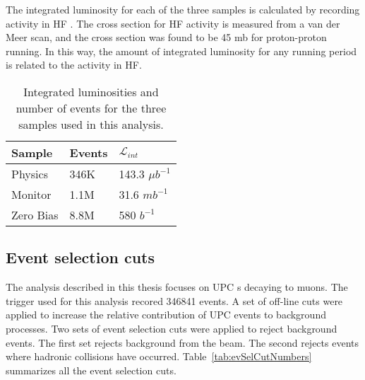       The integrated luminosity for each of the three samples is calculated
      by recording activity in HF \cite{cmsLumi}. 
      The cross section for HF activity is measured from a van der Meer scan, 
        and the cross section was found to be 45 mb for proton-proton running.
      In this way, the amount of integrated luminosity for any running period is
        related to the activity in HF. 
      \begin{table}
  	    \centering
  	    \begin{tabular}{|l|l|l|}
  	      \hline Sample & Events & $\mathcal{L}_{int}$ \\ \hline \hline
          Physics & 346K & 143.3 $\mu$$b^{-1}$ \\ \hline
          Monitor & 1.1M & 31.6 $mb^{-1}$ \\ \hline
          Zero Bias & 8.8M & 580 $b^{-1}$ \\ \hline 
  	    \end{tabular}
  	    \caption{Integrated luminosities and number of events for the three
  	      samples used in this analysis.}
  	    \label{tab:sampleLumiNevt}
      \end{table}
  
    \subsection{Event selection cuts}
      The analysis described in this thesis focuses on UPC \JPsi{}s decaying to 
        muons. 
      The trigger used for this analysis recored 346841 events.
      A set of off-line cuts were applied to increase the relative contribution 
        of UPC events to background processes. 
      Two sets of event selection cuts were applied to reject background events. 
      The first set rejects background from the beam.
      The second rejects events where hadronic collisions have occurred.
      Table~\ref{tab:evSelCutNumbers} summarizes all the event selection cuts. 
 
